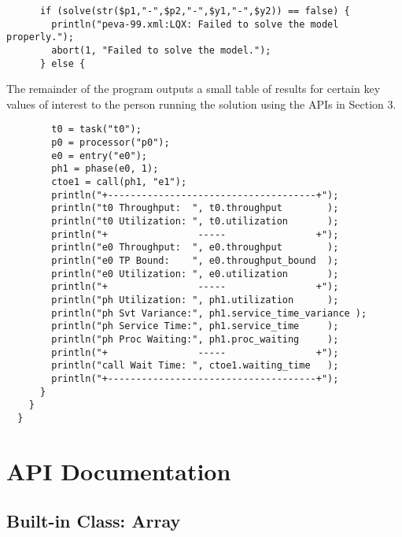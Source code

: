     \lstset{ firstnumber=9}     
    \begin{lstlisting}
      if (solve(str($p1,"-",$p2,"-",$y1,"-",$y2)) == false) {
        println("peva-99.xml:LQX: Failed to solve the model properly.");
        abort(1, "Failed to solve the model.");
      } else {
      \end{lstlisting}
      
      The remainder of the program outputs a small table of results for certain key
      values of interest to the person running the solution using the APIs in Section 3.
      
      \lstset{ firstnumber=13}    
      \begin{lstlisting}
        t0 = task("t0");
        p0 = processor("p0");
        e0 = entry("e0");
        ph1 = phase(e0, 1);
        ctoe1 = call(ph1, "e1");
        println("+-------------------------------------+");
        println("t0 Throughput:  ", t0.throughput        );
        println("t0 Utilization: ", t0.utilization       );
        println("+                -----                +");
        println("e0 Throughput:  ", e0.throughput        );
        println("e0 TP Bound:    ", e0.throughput_bound  );
        println("e0 Utilization: ", e0.utilization       );
        println("+                -----                +");
        println("ph Utilization: ", ph1.utilization      );
        println("ph Svt Variance:", ph1.service_time_variance );
        println("ph Service Time:", ph1.service_time     );
        println("ph Proc Waiting:", ph1.proc_waiting     );
        println("+                -----                +");
        println("call Wait Time: ", ctoe1.waiting_time   );
        println("+-------------------------------------+");
      }
    }
  }
\end{lstlisting}


\section{API Documentation}
\label{sec:api}
\subsection{Built-in Class: Array}


